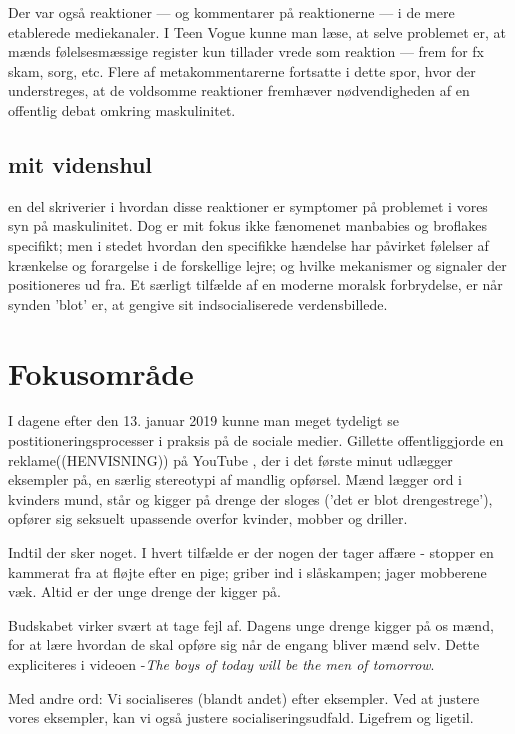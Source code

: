 Der var også reaktioner — og kommentarer på reaktionerne — i de
mere etablerede mediekanaler. I Teen Vogue kunne man læse, at
selve problemet er, at mænds følelsesmæssige register kun tillader
vrede som reaktion — frem for fx skam, sorg, etc. Flere af
metakommentarerne fortsatte i dette spor, hvor der understreges,
at de voldsomme reaktioner fremhæver nødvendigheden af en
offentlig debat omkring maskulinitet. 

\subsection{mit videnshul}

en del skriverier i hvordan disse reaktioner er symptomer på
problemet i vores syn på maskulinitet.  Dog er mit fokus ikke
fænomenet manbabies og broflakes specifikt; men i stedet hvordan
den specifikke hændelse har påvirket følelser af krænkelse og
forargelse i de forskellige lejre; og hvilke mekanismer og
signaler der positioneres ud fra.  Et særligt tilfælde af en
moderne moralsk forbrydelse, er når synden 'blot' er, at gengive
sit indsocialiserede verdensbillede.


\section{Fokusområde}

I dagene efter den 13.  januar 2019 kunne man meget tydeligt se
postitioneringsprocesser i praksis på de sociale medier.  Gillette
offentliggjorde en reklame((HENVISNING)) på YouTube , der i det
første minut udlægger eksempler på, en særlig stereotypi af
mandlig opførsel.  Mænd lægger ord i kvinders mund, står og kigger
på drenge der sloges ('det er blot drengestrege'), opfører sig
seksuelt upassende overfor kvinder, mobber og driller.

Indtil der sker noget. I hvert tilfælde er der nogen der tager
affære - stopper en kammerat fra at fløjte efter en pige; griber
ind i slåskampen; jager mobberene væk.  Altid er der unge drenge
der kigger på.

Budskabet virker svært at tage fejl af. Dagens unge drenge kigger
på os mænd, for at lære hvordan de skal opføre sig når de engang
bliver mænd selv.  Dette expliciteres i videoen -\textit{The boys
of today will be the men of tomorrow}.

Med andre ord: Vi socialiseres (blandt andet) efter eksempler. Ved
at justere vores eksempler, kan vi også justere
socialiseringsudfald. Ligefrem og ligetil.

